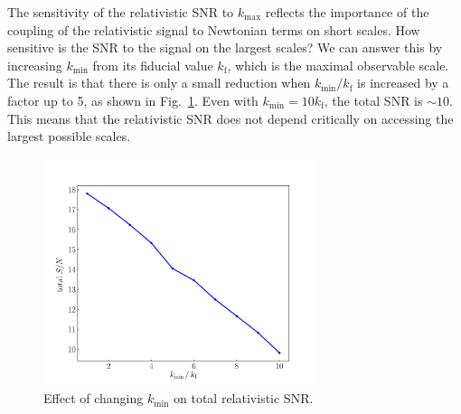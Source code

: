 {The sensitivity of the relativistic SNR to  $k_{\mathrm{max}}$ reflects the importance of the coupling of the relativistic signal to Newtonian terms on short scales. How sensitive is the SNR to the signal on the largest scales? We can answer this by increasing $k_{\mathrm{min}}$ from its fiducial value $k_{\mathrm{f}}$, which is the maximal observable scale. The result is that there is only a small reduction when $k_{\mathrm{min}}/k_{\mathrm{f}}$ is increased by a factor up to 5, as shown in Fig.~\ref{kmin}. 
{Even with $k_{\mathrm{min}}=10 k_{\mathrm{f}}$, the total SNR is $\sim 10$.} 
This means that the relativistic SNR does not depend critically on accessing the largest possible scales.}
\begin{figure}[ht]
\centering
\includegraphics[width=8.0cm]{fig/cumDoppSnr_kmin-eps-converted-to}
\caption{{Effect of changing $k_{\mathrm{min}}$ on  total relativistic SNR.} 
} \label{kmin}
\end{figure} 

